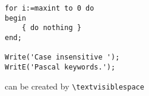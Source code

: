 \documentclass{article}
\begin{document}
\begin{lstlisting}
for i:=maxint to 0 do
begin
    { do nothing }
end;

Write('Case insensitive ');
WritE('Pascal keywords.');
\end{lstlisting}

\noindent \textvisiblespace{} can be created by \texttt{\textbackslash{}textvisiblespace}
\end{document}
